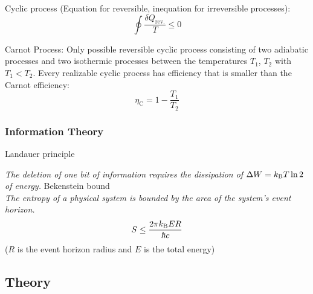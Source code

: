 			\noindent
			Cyclic process (Equation for reversible, inequation for irreversible processes):
			\begin{equation}
				\oint \frac{\delta Q_\text{rev.}}{T} \le 0
			\end{equation}

			\noindent
			Carnot Process:
			Only possible reversible cyclic process consisting of two adiabatic processes and two isothermic processes between the temperatures $T_1$, $T_2$ with $T_1 < T_2$. Every realizable cyclic process has efficiency that is smaller than the Carnot efficiency:
			\begin{equation}
				\eta_\text{C} = 1-\frac{T_1}{T_2}
			\end{equation}

		\subsubsection{Information Theory}
			Landauer principle

			\indent \emph{The deletion of one bit of information requires the dissipation of $\Delta W = k_{\text{B}} T \ln 2$ of energy.}\nl
			\noindent
			Bekenstein bound \\
			\indent \emph{The entropy of a physical system is bounded by the area of the system's event horizon.}
			\begin{equation}
				S \le \frac{2\pi k_{\text{B}} E R}{\hbar c}
			\end{equation}
			($R$ is the event horizon radius and $E$ is the total energy)

	\subsection{Theory}
